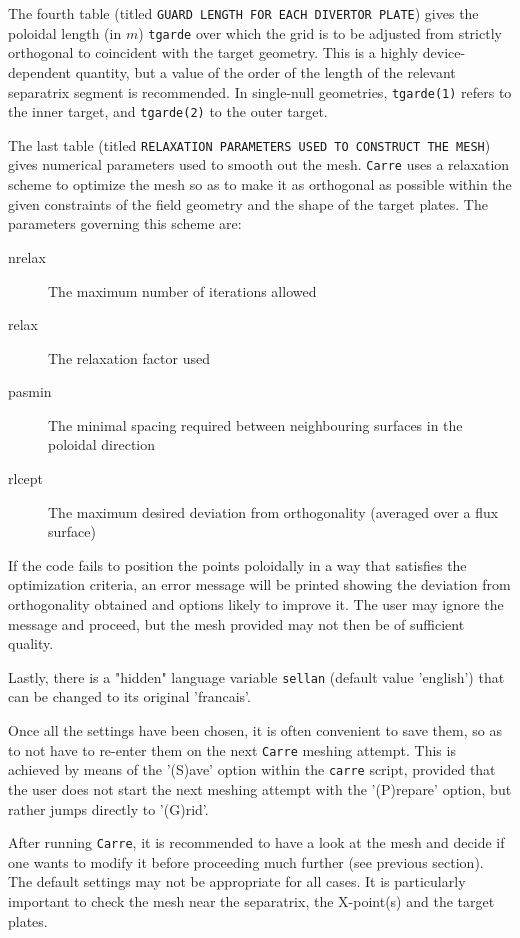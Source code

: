 \documentclass[a4paper,10pt]{report}
\begin{document}
The fourth table (titled {\tt GUARD LENGTH FOR EACH DIVERTOR PLATE}) gives
the poloidal length (in $m$) {\tt tgarde} over which the grid is to be adjusted from strictly orthogonal to coincident with the target geometry. This is a highly device-dependent quantity, but a value of the order of the length of the relevant separatrix segment is recommended. In single-null geometries, {\tt tgarde(1)} refers to the inner target, and {\tt tgarde(2)} to the outer target.

The last table (titled {\tt RELAXATION PARAMETERS USED TO CONSTRUCT THE MESH})
gives numerical parameters used to smooth out the mesh.
{\tt Carre} uses a relaxation scheme to optimize the mesh so as to make it as orthogonal as possible within the given
constraints of the field geometry and the shape of the target plates. The parameters governing this scheme are:

\begin{description}
  \item[nrelax] The maximum number of iterations allowed
  \item[relax] The relaxation factor used
  \item[pasmin] The minimal spacing required between neighbouring surfaces in the poloidal direction
  \item[rlcept] The maximum desired deviation from orthogonality (averaged over a flux surface)
\end{description}

If the code fails to position the points poloidally in a way that satisfies the optimization
criteria, an error message will be printed showing the deviation from orthogonality obtained and
options likely to improve it. The user
may ignore the message and proceed, but the mesh provided may not then be of sufficient quality.

Lastly, there is a "hidden" language variable {\tt sellan} (default value 'english') that can be changed
to its original 'francais'.

Once all the settings have been chosen, it is often convenient to save them, so as to not have to re-enter them on the next {\tt Carre} meshing attempt. This is achieved by means of the '(S)ave' option within the {\tt carre} script, provided that the user does not start the next meshing attempt with the '(P)repare' option, but rather jumps directly to '(G)rid'.

After running {\tt Carre}, it is recommended to have a look at the mesh and decide if one wants to modify it before
proceeding much further (see previous section). The default settings may not be appropriate for all cases. It is
particularly important to check the mesh near the separatrix, the X-point(s) and the target plates.
\end{document}
